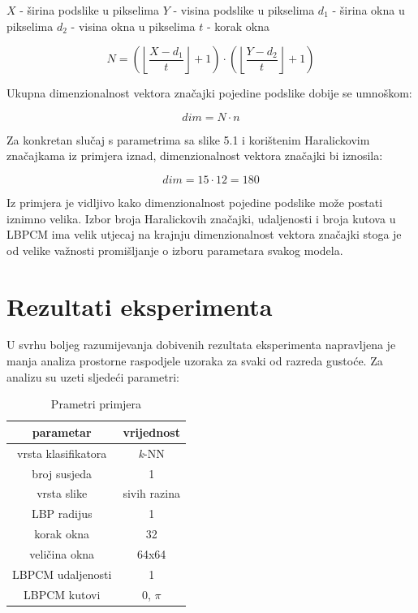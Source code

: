 \documentclass[times, utf8, zavrsni, numeric]{fer}
\begin{document}
\begin{center}

\(X\) - širina podslike u pikselima
\(Y\) - visina podslike u pikselima
\(d_1\) - širina okna u pikselima
\(d_2\) - visina okna u pikselima
\(t\) - korak okna

\[
N = \left(\left\lfloor\frac{X-d_1}{t}\right\rfloor + 1\right) \cdot
\left(\left\lfloor\frac{Y-d_2}{t}\right\rfloor + 1\right)
\]

Ukupna dimenzionalnost vektora značajki pojedine podslike dobije se umnoškom:

\[
dim = N \cdot n
\]

Za konkretan slučaj s parametrima sa slike 5.1 i korištenim Haralickovim 
značajkama iz primjera iznad, dimenzionalnost vektora značajki bi iznosila:

\[
dim = 15 \cdot 12 = 180
\]

\end{center}

Iz primjera je vidljivo kako dimenzionalnost pojedine podslike može postati
iznimno velika. Izbor broja Haralickovih značajki, udaljenosti i broja kutova u 
LBPCM ima velik utjecaj na krajnju dimenzionalnost vektora značajki stoga je
od velike važnosti promišljanje o izboru parametara svakog modela. 


\chapter{Rezultati eksperimenta}

U svrhu boljeg razumijevanja dobivenih rezultata eksperimenta napravljena je manja  analiza
prostorne raspodjele uzoraka za svaki od razreda gustoće. Za analizu su uzeti sljedeći parametri:

\begin{table}[ht]
\centering
\begin{tabular}{c|c}
parametar & vrijednost \\
\hline
vrsta klasifikatora & \textit{k}-NN \\
broj susjeda & 1 \\
vrsta slike & sivih razina \\
LBP radijus & 1 \\
korak okna & 32 \\
veličina okna & 64x64 \\
LBPCM udaljenosti & 1 \\
LBPCM kutovi & 0, \(\pi\) \\
\end{tabular}
\caption{Prametri primjera} 
\end{table}
\end{document}
